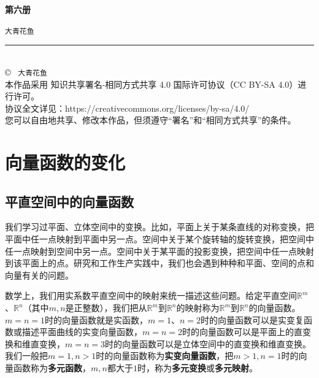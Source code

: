 \documentclass[12pt,UTF8,fontset=none]{ctexbook}
\newcommand{\mytitle}{第六册}
\newcommand{\myauthor}{大青花鱼}
\begin{document}
\cleardoublepage                %
\thispagestyle{empty}           %
\begin{center}
    \vspace*{2cm}               %
    
    { \bfseries \mytitle}
    
    \vspace{1cm}              %
    
    { \texttt{\myauthor}}
    
    \vfill                      %
    
    \rule{0.5\textwidth}{0.4pt} \\[0.5cm]
    
    {\scriptsize
    \copyright\ \the\year{} \texttt{\myauthor} \\[0.2cm]
    本作品采用 知识共享署名-相同方式共享 4.0 国际许可协议（CC BY-SA 4.0）进行许可。\\
    协议全文详见：https://creativecommons.org/licenses/by-sa/4.0/ \\
    您可以自由地共享、修改本作品，但须遵守“署名”和“相同方式共享”的条件。
    }
\end{center}
\newpage   
\tableofcontents
\newpage

\chapter{向量函数的变化}

\section{平直空间中的向量函数}

我们学习过平面、立体空间中的变换。比如，平面上关于某条直线的对称变换，把平面中任一点映射到平面中另一点。空间中关于某个旋转轴的旋转变换，把空间中任一点映射到空间中另一点。空间中关于某平面的投影变换，把空间中任一点映射到该平面上的点。研究和工作生产实践中，我们也会遇到种种和平面、空间的点和向量有关的问题。

\begin{ex}
\end{ex}

数学上，我们用实系数平直空间中的映射来统一描述这些问题。给定平直空间$\mathbb{R}^m$、$\mathbb{R}^n$（其中$m,n$是正整数），我们把从$\mathbb{R}^m$到$\mathbb{R}^n$的映射称为$\mathbb{R}^m$到$\mathbb{R}^n$的向量函数。$m=n=1$时的向量函数就是实函数，$m=1$、$n=2$时的向量函数可以是实变复函数或描述平面曲线的实变向量函数，$m=n=2$时的向量函数可以是平面上的直变换和维直变换，$m=n=3$时的向量函数可以是立体空间中的直变换和维直变换。我们一般把$m=1,n>1$时的向量函数称为\textbf{实变向量函数}，把$m>1,n=1$时的向量函数称为\textbf{多元函数}，$m,n$都大于$1$时，称为\textbf{多元变换}或\textbf{多元映射}。
\end{document}
